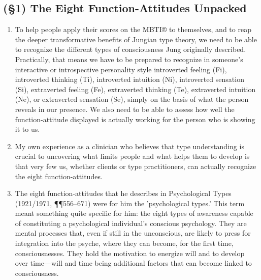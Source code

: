 \subsection{(\S1) The Eight Function-Attitudes Unpacked}

\begin{enumerate}

    \item {} To help people apply their
        scores on the MBTI® to themselves, and to reap the deeper
        transformative benefits of Jungian type theory, we need to be able to
        recognize the different types of consciousness Jung originally
        described. Practically, that means we have to be prepared to recognize
        in someone's interactive or introspective personality style introverted
        feeling (Fi), introverted thinking (Ti), introverted intuition (Ni),
        introverted sensation (Si), extraverted feeling (Fe), extraverted
        thinking (Te), extraverted intuition (Ne), or extraverted sensation
        (Se), simply on the basis of what the person reveals in our presence.
        We also need to be able to assess how well the function-attitude
        displayed is actually working for the person who is showing it to us.

    \item {} My own experience as a
        clinician who believes that type understanding is crucial to uncovering
        what limits people and what helps them to develop is that very few us,
        whether clients or type practitioners, can actually recognize the eight
        function-attitudes.

    \item {} The eight function-attitudes
        that he describes in Psychological Types (1921/1971, ¶¶556–671) were
        for him the 'psychological types.' This term meant something quite
        specific for him: the eight types of awareness capable of constituting
        a psychological individual's conscious psychology. They are mental
        processes that, even if still in the unconscious, are likely to press
        for integration into the psyche, where they can become, for the first
        time, consciousnesses. They hold the motivation to energize will and to
        develop over time—will and time being additional factors that can
        become linked to consciousness.

\end{enumerate}

